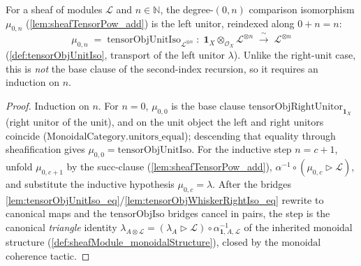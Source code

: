 \begin{lemma}

  \label{lem:tensorPowAdd_zero_left}
  For a sheaf of modules \(\mathcal{L}\) and \(n \in \mathbb{N}\), the degree-\((0,n)\)
  comparison isomorphism \(\mu_{0,n}\) (\cref{lem:sheafTensorPow_add}) is the left
  unitor, reindexed along \(0 + n = n\):
  \[
    \mu_{0,n} \;=\;
      \mathrm{tensorObjUnitIso}_{\mathcal{L}^{\otimes n}}
      \;:\; \mathbf{1}_X \otimes_{\mathcal{O}_X} \mathcal{L}^{\otimes n}
      \;\xrightarrow{\ \sim\ }\; \mathcal{L}^{\otimes n}
  \]
  (\cref{def:tensorObjUnitIso}, transport of the left unitor \(\lambda\)). Unlike
  the right-unit case, this is \emph{not} the base clause of the second-index
  recursion, so it requires an induction on \(n\).
\end{lemma}

\begin{proof}
  \leanok
  Induction on \(n\). For \(n = 0\), \(\mu_{0,0}\) is the base clause
  \(\mathrm{tensorObjRightUnitor}_{\mathbf{1}_X}\) (right unitor of the unit), and on
  the unit object the left and right unitors coincide
  (\(\mathrm{MonoidalCategory.unitors\_equal}\)); descending that equality through
  sheafification gives \(\mu_{0,0} = \mathrm{tensorObjUnitIso}\). For the inductive
  step \(n = c+1\), unfold \(\mu_{0,c+1}\) by the succ-clause
  (\cref{lem:sheafTensorPow_add}), \(\alpha^{-1} \circ (\mu_{0,c} \rhd \mathcal{L})\),
  and substitute the inductive hypothesis \(\mu_{0,c} = \lambda\). After the bridges
  \cref{lem:tensorObjUnitIso_eq}/\cref{lem:tensorObjWhiskerRightIso_eq} rewrite to
  canonical maps and the \(\mathrm{tensorObjIso}\) bridges cancel in pairs, the step
  is the canonical \emph{triangle} identity \(\lambda_{A \otimes \mathcal{L}} =
  (\lambda_A \rhd \mathcal{L}) \circ \alpha^{-1}_{\mathbf{1}, A, \mathcal{L}}\) of the
  inherited monoidal structure (\cref{def:sheafModule_monoidalStructure}), closed by
  the \(\mathrm{monoidal}\) coherence tactic.
\end{proof}

